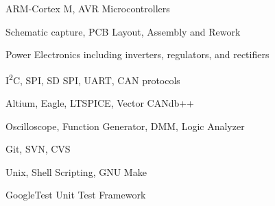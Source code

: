 \begin{cvskillscolumn}

                {\item ARM-Cortex M, AVR Microcontrollers
                 \item Schematic capture, PCB Layout, Assembly and Rework
                 \item Power Electronics including inverters, regulators, and rectifiers
                 \item I\textsuperscript{2}C, SPI, SD SPI, UART, CAN protocols}
                {\item Altium, Eagle, LTSPICE, Vector CANdb++
                 \item Oscilloscope, Function Generator, DMM, Logic Analyzer
                 \item Git, SVN, CVS
                 \item Unix, Shell Scripting, GNU Make
                 \item GoogleTest Unit Test Framework}
\end{cvskillscolumn}
